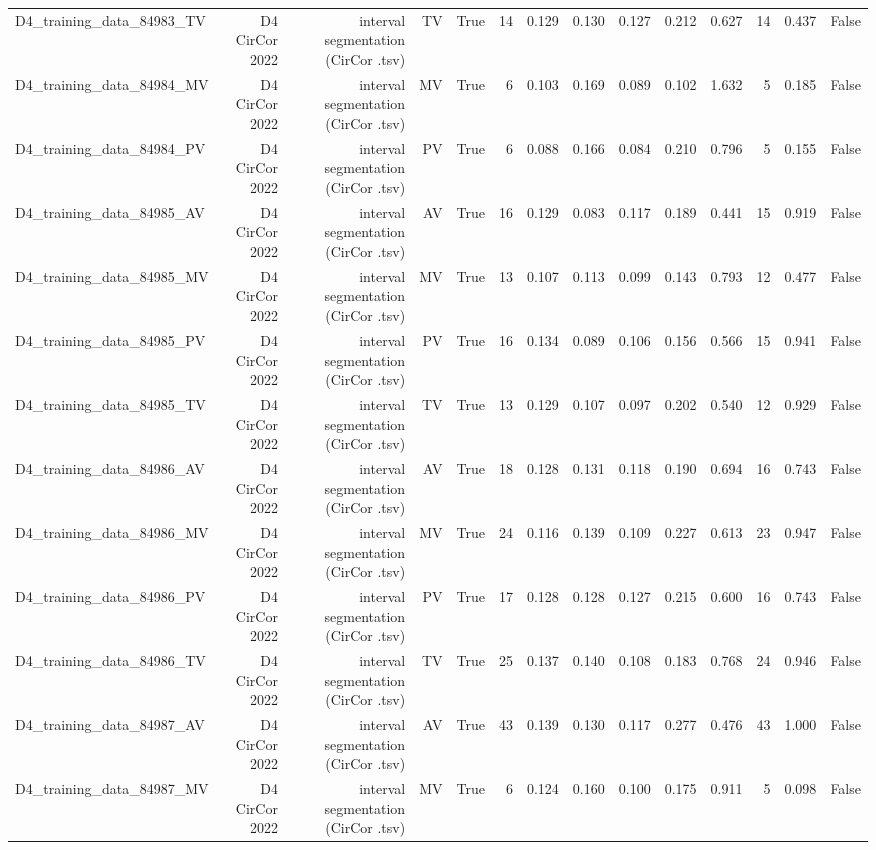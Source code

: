 \begin{table}[htbp]
\begin{tabular}{lrrrrrrrrrrrrr}
    D4\_training\_data\_84983\_TV & D4 CirCor 2022 & interval segmentation (CirCor .tsv) & TV & True & 14 & 0.129 & 0.130 & 0.127 & 0.212 & 0.627 & 14 & 0.437 & False \\
    D4\_training\_data\_84984\_MV & D4 CirCor 2022 & interval segmentation (CirCor .tsv) & MV & True & 6 & 0.103 & 0.169 & 0.089 & 0.102 & 1.632 & 5 & 0.185 & False \\
    D4\_training\_data\_84984\_PV & D4 CirCor 2022 & interval segmentation (CirCor .tsv) & PV & True & 6 & 0.088 & 0.166 & 0.084 & 0.210 & 0.796 & 5 & 0.155 & False \\
    D4\_training\_data\_84985\_AV & D4 CirCor 2022 & interval segmentation (CirCor .tsv) & AV & True & 16 & 0.129 & 0.083 & 0.117 & 0.189 & 0.441 & 15 & 0.919 & False \\
    D4\_training\_data\_84985\_MV & D4 CirCor 2022 & interval segmentation (CirCor .tsv) & MV & True & 13 & 0.107 & 0.113 & 0.099 & 0.143 & 0.793 & 12 & 0.477 & False \\
    D4\_training\_data\_84985\_PV & D4 CirCor 2022 & interval segmentation (CirCor .tsv) & PV & True & 16 & 0.134 & 0.089 & 0.106 & 0.156 & 0.566 & 15 & 0.941 & False \\
    D4\_training\_data\_84985\_TV & D4 CirCor 2022 & interval segmentation (CirCor .tsv) & TV & True & 13 & 0.129 & 0.107 & 0.097 & 0.202 & 0.540 & 12 & 0.929 & False \\
    D4\_training\_data\_84986\_AV & D4 CirCor 2022 & interval segmentation (CirCor .tsv) & AV & True & 18 & 0.128 & 0.131 & 0.118 & 0.190 & 0.694 & 16 & 0.743 & False \\
    D4\_training\_data\_84986\_MV & D4 CirCor 2022 & interval segmentation (CirCor .tsv) & MV & True & 24 & 0.116 & 0.139 & 0.109 & 0.227 & 0.613 & 23 & 0.947 & False \\
    D4\_training\_data\_84986\_PV & D4 CirCor 2022 & interval segmentation (CirCor .tsv) & PV & True & 17 & 0.128 & 0.128 & 0.127 & 0.215 & 0.600 & 16 & 0.743 & False \\
    D4\_training\_data\_84986\_TV & D4 CirCor 2022 & interval segmentation (CirCor .tsv) & TV & True & 25 & 0.137 & 0.140 & 0.108 & 0.183 & 0.768 & 24 & 0.946 & False \\
    D4\_training\_data\_84987\_AV & D4 CirCor 2022 & interval segmentation (CirCor .tsv) & AV & True & 43 & 0.139 & 0.130 & 0.117 & 0.277 & 0.476 & 43 & 1.000 & False \\
    D4\_training\_data\_84987\_MV & D4 CirCor 2022 & interval segmentation (CirCor .tsv) & MV & True & 6 & 0.124 & 0.160 & 0.100 & 0.175 & 0.911 & 5 & 0.098 & False \\

\end{tabular}
\end{table}
